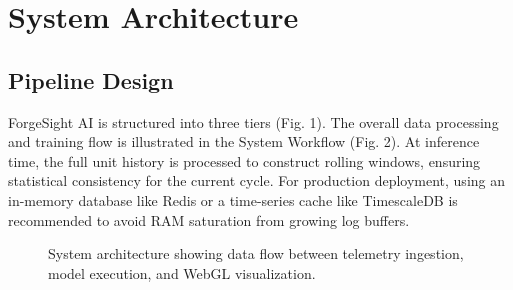\documentclass[letterpaper, 10 pt, conference]{ieeeconf}
\begin{document}
\section{System Architecture}
\label{sec:architecture}

\subsection{Pipeline Design}
ForgeSight AI is structured into three tiers (Fig. 1). The overall data processing and training flow is illustrated in the System Workflow (Fig. 2). At inference time, the full unit history is processed to construct rolling windows, ensuring statistical consistency for the current cycle. For production deployment, using an in-memory database like Redis or a time-series cache like TimescaleDB is recommended to avoid RAM saturation from growing log buffers.

\begin{figure}[htbp]
\centering
{}
\caption{System architecture showing data flow between telemetry ingestion, model execution, and WebGL visualization.}
\label{fig:arch}
\end{figure}
\end{document}
